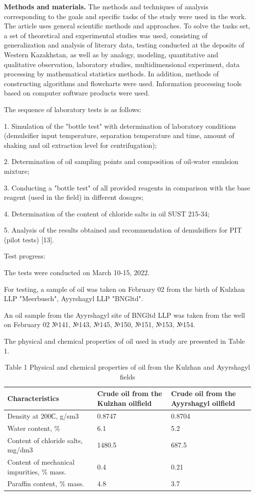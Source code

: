 \begin{multicols}{2}
{\bfseries Methods and materials.} The methods and techniques of analysis
corresponding to the goals and specific tasks of the study were used in
the work. The article uses general scientific methods and approaches. To
solve the tasks set, a set of theoretical and experimental studies was
used, consisting of generalization and analysis of literary data,
testing conducted at the deposits of Western Kazakhstan, as well as by
analogy, modeling, quantitative and qualitative observation, laboratory
studies, multidimensional experiment, data processing by mathematical
statistics methods. In addition, methods of constructing algorithms and
flowcharts were used. Information processing tools based on computer
software products were used.

The sequence of laboratory tests is as follows:

1. Simulation of the "bottle test" with determination of laboratory
conditions (demulsifier input temperature, separation temperature and
time, amount of shaking and oil extraction level for centrifugation);

2. Determination of oil sampling points and composition of oil-water
emulsion mixture;

3. Conducting a "bottle test" of all provided reagents in comparison
with the base reagent (used in the field) in different dosages;

4. Determination of the content of chloride salts in oil SUST 215-34;

5. Analysis of the results obtained and recommendation of demulsifiers
for PIT (pilot tests) {[}13{]}.

Test progress:

The tests were conducted on March 10-15, 2022.

For testing, a sample of oil was taken on February 02 from the birth of
Kulzhan LLP "Meerbusch", Ayyrshagyl LLP "BNGltd".

An oil sample from the Ayyrshagyl site of BNGltd LLP was taken from the
well on February 02 №141, №143, №145, №150, №151, №153, №154.

The physical and chemical properties of oil used in study are presented
in Table 1.
\end{multicols}

\begin{table}[H]
\caption*{Table 1 Physical and chemical properties of oil from the Kulzhan and Ayyrshagyl fields}
\centering
\begin{tabular}{|l|p{}|p{}|}
\hline
Characteristics & Crude oil from the Kulzhan oilfield & Crude oil from the Ayyrshagyl oilfield \\ \hline
Density at 200С, g/sm3 & 0.8747 & 0.8704 \\ \hline
Water content, \% & 6.1 & 5.2 \\ \hline
Content of chloride salts, mg/dm3 & 1480.5 & 687.5 \\ \hline
Content of mechanical impurities, \% mass. & 0.4 & 0.21 \\ \hline
Paraffin content, \% mass. & 4.8 & 3.7 \\ \hline
\end{tabular}%
\end{table}

